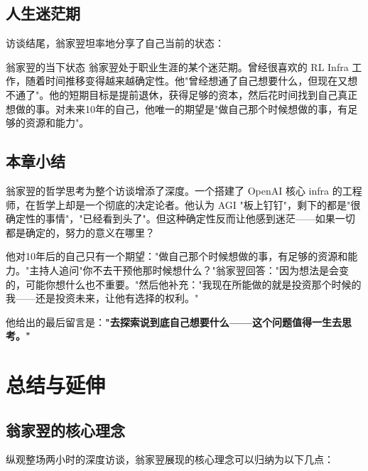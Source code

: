 \documentclass[a4paper]{article}
\begin{document}
\subsection{人生迷茫期}

访谈结尾，翁家翌坦率地分享了自己当前的状态：

\begin{knowledgebox}{翁家翌的当下状态}
翁家翌处于职业生涯的某个迷茫期。曾经很喜欢的 RL Infra 工作，随着时间推移变得越来越确定性。他"曾经想通了自己想要什么，但现在又想不通了"。他的短期目标是提前退休，获得足够的资本，然后花时间找到自己真正想做的事。对未来10年的自己，他唯一的期望是"做自己那个时候想做的事，有足够的资源和能力"。
\end{knowledgebox}

\subsection{本章小结}

翁家翌的哲学思考为整个访谈增添了深度。一个搭建了 OpenAI 核心 infra 的工程师，在哲学上却是一个彻底的决定论者。他认为 AGI "板上钉钉"，剩下的都是"很确定性的事情"，"已经看到头了"。但这种确定性反而让他感到迷茫——如果一切都是确定的，努力的意义在哪里？

他对10年后的自己只有一个期望："做自己那个时候想做的事，有足够的资源和能力。"主持人追问"你不去干预他那时候想什么？"翁家翌回答："因为想法是会变的，可能你想什么也不重要。"然后他补充："我现在所能做的就是投资那个时候的我——还是投资未来，让他有选择的权利。"

他给出的最后留言是：\textbf{"去探索说到底自己想要什么——这个问题值得一生去思考。"}


\section{总结与延伸}

\subsection{翁家翌的核心理念}

纵观整场两小时的深度访谈，翁家翌展现的核心理念可以归纳为以下几点：
\end{document}
